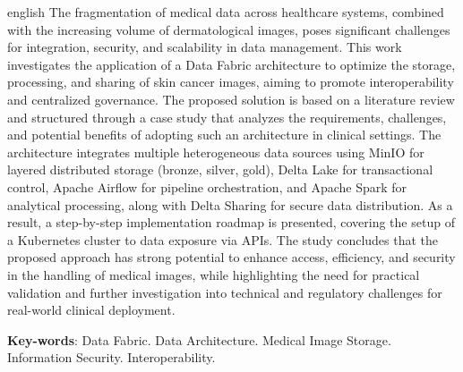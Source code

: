\begin{resumo}[Abstract]
 \begin{otherlanguage*}{english}
  The fragmentation of medical data across healthcare systems, combined with the increasing volume of dermatological images, poses significant challenges for integration, security, and scalability in data management. This work investigates the application of a Data Fabric architecture to optimize the storage, processing, and sharing of skin cancer images, aiming to promote interoperability and centralized governance. The proposed solution is based on a literature review and structured through a case study that analyzes the requirements, challenges, and potential benefits of adopting such an architecture in clinical settings. The architecture integrates multiple heterogeneous data sources using MinIO for layered distributed storage (bronze, silver, gold), Delta Lake for transactional control, Apache Airflow for pipeline orchestration, and Apache Spark for analytical processing, along with Delta Sharing for secure data distribution. As a result, a step-by-step implementation roadmap is presented, covering the setup of a Kubernetes cluster to data exposure via APIs. The study concludes that the proposed approach has strong potential to enhance access, efficiency, and security in the handling of medical images, while highlighting the need for practical validation and further investigation into technical and regulatory challenges for real-world clinical deployment.

   \vspace{\onelineskip}
 
   \noindent 
   \textbf{Key-words}: Data Fabric. Data Architecture. Medical Image Storage. Information Security. Interoperability.
 \end{otherlanguage*}
\end{resumo}
